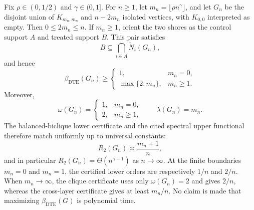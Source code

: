 Fix \(\rho\in(0,1/2)\) and \(\gamma\in(0,1]\).  For \(n\geq1\), let \(m_n=\lfloor\rho n^{\gamma}\rfloor\), and let \(G_n\) be the disjoint union of \(K_{m_n,m_n}\) and \(n-2m_n\) isolated vertices, with \(K_{0,0}\) interpreted as empty.  Then \(0\leq2m_n\leq n\).  If \(m_n\geq1\), orient the two shores as the control support \(A\) and treated support \(B\).  This pair satisfies
\[
B\subseteq\bigcap_{i\in A}\widetilde N_i(G_n),
\]
and hence
\[
\beta_{\mathrm{DTE}}(G_n)\geq
\begin{cases}
1,&m_n=0,\\
\max\{2,m_n\},&m_n\geq1.
\end{cases}
\]
Moreover,
\[
\omega(G_n)=
\begin{cases}
1,&m_n=0,\\
2,&m_n\geq1,
\end{cases}
\qquad
\lambda(G_n)=m_n.
\]
The balanced-biclique lower certificate and the cited spectral upper functional therefore match uniformly up to universal constants:
\[
R_2(G_n)\asymp\frac{m_n+1}{n},
\]
and in particular \(R_2(G_n)=\Theta(n^{\gamma-1})\) as \(n\to\infty\).  At the finite boundaries \(m_n=0\) and \(m_n=1\), the certified lower orders are respectively \(1/n\) and \(2/n\).  When \(m_n\to\infty\), the clique certificate uses only \(\omega(G_n)=2\) and gives \(2/n\), whereas the cross-layer certificate gives at least \(m_n/n\).  No claim is made that maximizing \(\beta_{\mathrm{DTE}}(G)\) is polynomial time.